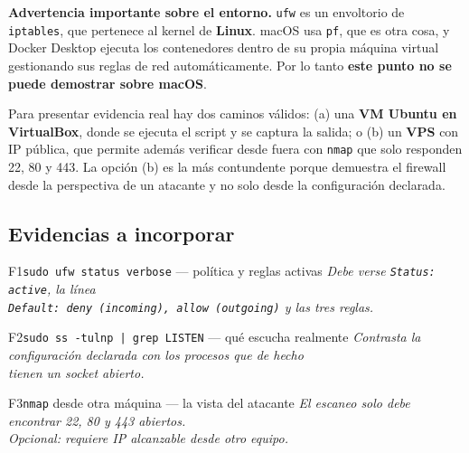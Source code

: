 \documentclass[11pt,letterpaper]{article}
\begin{document}
\begin{alerta}
\textbf{Advertencia importante sobre el entorno.} \texttt{ufw} es un envoltorio
de \texttt{iptables}, que pertenece al kernel de \textbf{Linux}. macOS usa
\texttt{pf}, que es otra cosa, y Docker Desktop ejecuta los contenedores dentro
de su propia máquina virtual gestionando sus reglas de red automáticamente. Por
lo tanto \textbf{este punto no se puede demostrar sobre macOS}.

Para presentar evidencia real hay dos caminos válidos: (a) una \textbf{VM Ubuntu
en VirtualBox}, donde se ejecuta el script y se captura la salida; o (b) un
\textbf{VPS} con IP pública, que permite además verificar desde fuera con
\texttt{nmap} que solo responden 22, 80 y 443. La opción (b) es la más
contundente porque demuestra el firewall desde la perspectiva de un atacante y
no solo desde la configuración declarada.
\end{alerta}

\subsection{Evidencias a incorporar}

\begin{captura}{F1}{\texttt{sudo ufw status verbose} — política y reglas activas}
\vspace{2.4cm}
\centering\itshape\color{qcGray}\footnotesize
Debe verse \texttt{Status: active}, la línea\\
\texttt{Default: deny (incoming), allow (outgoing)} y las tres reglas.
\vspace{2.2cm}
\end{captura}

\vspace{0.6em}
\begin{captura}{F2}{\texttt{sudo ss -tulnp | grep LISTEN} — qué escucha realmente}
\vspace{2.0cm}
\centering\itshape\color{qcGray}\footnotesize
Contrasta la configuración declarada con los procesos que de hecho\\
tienen un socket abierto.
\vspace{1.8cm}
\end{captura}

\vspace{0.6em}
\begin{captura}{F3}{\texttt{nmap} desde otra máquina — la vista del atacante}
\vspace{2.0cm}
\centering\itshape\color{qcGray}\footnotesize
El escaneo solo debe encontrar 22, 80 y 443 abiertos.\\
\emph{Opcional: requiere IP alcanzable desde otro equipo.}
\vspace{1.8cm}
\end{captura}
\end{document}
